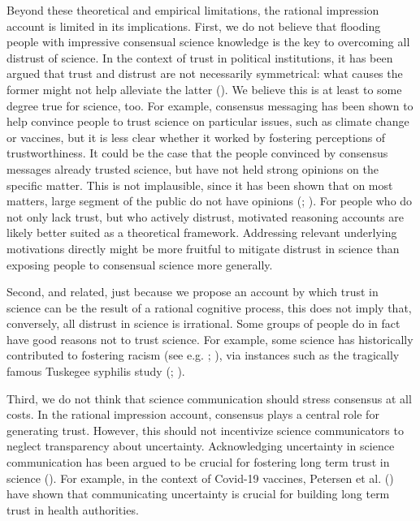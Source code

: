 \documentclass[
  jou,
  floatsintext,
  longtable,
  nolmodern,
  notxfonts,
  notimes,
  colorlinks=true,linkcolor=blue,citecolor=blue,urlcolor=blue]{apa7}
\begin{document}
Beyond these theoretical and empirical limitations, the rational
impression account is limited in its implications. First, we do not
believe that flooding people with impressive consensual science
knowledge is the key to overcoming all distrust of science. In the
context of trust in political institutions, it has been argued that
trust and distrust are not necessarily symmetrical: what causes the
former might not help alleviate the latter
().
We believe this is at least to some degree true for science, too. For
example, consensus messaging has been shown to help convince people to
trust science on particular issues, such as climate change or vaccines,
but it is less clear whether it worked by fostering perceptions of
trustworthiness. It could be the case that the people convinced by
consensus messages already trusted science, but have not held strong
opinions on the specific matter. This is not implausible, since it has
been shown that on most matters, large segment of the public do not have
opinions (;
). For people
who do not only lack trust, but who actively distrust, motivated
reasoning accounts are likely better suited as a theoretical framework.
Addressing relevant underlying motivations directly might be more
fruitful to mitigate distrust in science than exposing people to
consensual science more generally.

Second, and related, just because we propose an account by which trust
in science can be the result of a rational cognitive process, this does
not imply that, conversely, all distrust in science is irrational. Some
groups of people do in fact have good reasons not to trust science. For
example, some science has historically contributed to fostering racism
(see e.g. ; ), via instances such as the tragically famous Tuskegee syphilis
study (;
).

Third, we do not think that science communication should stress
consensus at all costs. In the rational impression account, consensus
plays a central role for generating trust. However, this should not
incentivize science communicators to neglect transparency about
uncertainty. Acknowledging uncertainty in science communication has been
argued to be crucial for fostering long term trust in science
(). For example, in the context of Covid-19 vaccines, Petersen et
al. ()
have shown that communicating uncertainty is crucial for building long
term trust in health authorities.
\end{document}
